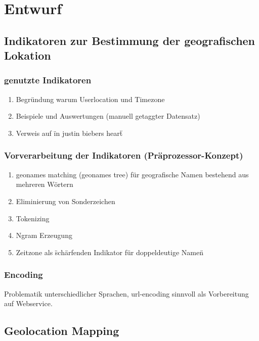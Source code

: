 \chapter{Entwurf} 

\section{Indikatoren zur Bestimmung der geografischen Lokation}

	\subsection{genutzte Indikatoren}
		\begin{enumerate}
			\item Begründung warum Userlocation und Timezone
			\item Beispiele und Auswertungen (manuell getaggter Datensatz)
			\item Verweis auf \"in justin biebers heart\"
		\end{enumerate}

	\subsection{Vorverarbeitung der Indikatoren (Präprozessor-Konzept)}
		\begin{enumerate}
			\item geonames matching (geonames tree) für geografische Namen bestehend aus mehreren Wörtern
			\item Eliminierung von Sonderzeichen
			\item Tokenizing
			\item Ngram Erzeugung
			\item {} Zeitzone als \"schärfenden Indikator für doppeldeutige Namen\"
		\end{enumerate}

	\subsection{Encoding}
		Problematik unterschiedlicher Sprachen, 
		url-encoding sinnvoll als Vorbereitung auf Webservice. 

\section{Geolocation Mapping}

